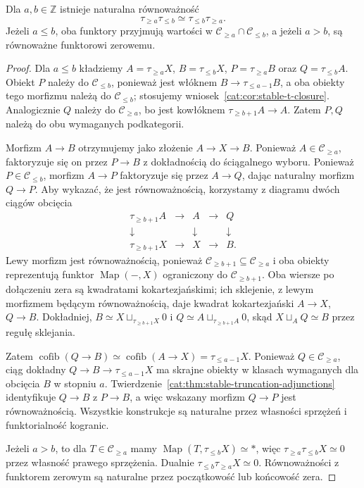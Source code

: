 \begin{stwierdzenie}\label{cat:prop:stable-truncation-commute}
Dla $a,b\in\mathbb Z$ istnieje naturalna równoważność
\[
 \tau_{\geq a}\tau_{\leq b}\simeq
 \tau_{\leq b}\tau_{\geq a}.
\]
Jeżeli $a\leq b$, oba funktory przyjmują wartości w $\mathcal C_{\geq a}\cap\mathcal C_{\leq b}$, a jeżeli $a>b$, są równoważne funktorowi zerowemu.
\end{stwierdzenie}
\begin{proof}
Dla $a\leq b$ kładziemy $A=\tau_{\geq a}X$, $B=\tau_{\leq b}X$, $P=\tau_{\geq a}B$ oraz $Q=\tau_{\leq b}A$. Obiekt $P$ należy do $\mathcal C_{\leq b}$, ponieważ jest włóknem $B\to\tau_{\leq a-1}B$, a oba obiekty tego morfizmu należą do $\mathcal C_{\leq b}$; stosujemy wniosek~\ref{cat:cor:stable-t-closure}. Analogicznie $Q$ należy do $\mathcal C_{\geq a}$, bo jest kowłóknem $\tau_{\geq b+1}A\to A$. Zatem $P,Q$ należą do obu wymaganych podkategorii.

Morfizm $A\to B$ otrzymujemy jako złożenie $A\to X\to B$. Ponieważ $A\in\mathcal C_{\geq a}$, faktoryzuje się on przez $P\to B$ z dokładnością do ściągalnego wyboru. Ponieważ $P\in\mathcal C_{\leq b}$, morfizm $A\to P$ faktoryzuje się przez $A\to Q$, dając naturalny morfizm $Q\to P$. Aby wykazać, że jest równoważnością, korzystamy z diagramu dwóch ciągów obcięcia
\[
\begin{array}{ccccc}
 \tau_{\geq b+1}A&\longrightarrow&A&\longrightarrow&Q\\
 \downarrow&&\downarrow&&\downarrow\\
 \tau_{\geq b+1}X&\longrightarrow&X&\longrightarrow&B .
\end{array}
\]
Lewy morfizm jest równoważnością, ponieważ $\mathcal C_{\geq b+1}\subseteq\mathcal C_{\geq a}$ i oba obiekty reprezentują funktor $\operatorname{Map}(-,X)$ ograniczony do $\mathcal C_{\geq b+1}$. Oba wiersze po dołączeniu zera są kwadratami kokartezjańskimi; ich sklejenie, z lewym morfizmem będącym równoważnością, daje kwadrat kokartezjański $A\to X$, $Q\to B$. Dokładniej, $B\simeq X\sqcup_{\tau_{\geq b+1}X}0$ i $Q\simeq A\sqcup_{\tau_{\geq b+1}A}0$, skąd $X\sqcup_A Q\simeq B$ przez regułę sklejania.

Zatem $\operatorname{cofib}(Q\to B)\simeq\operatorname{cofib}(A\to X)=\tau_{\leq a-1}X$. Ponieważ $Q\in\mathcal C_{\geq a}$, ciąg dokładny $Q\to B\to\tau_{\leq a-1}X$ ma skrajne obiekty w klasach wymaganych dla obcięcia $B$ w stopniu $a$. Twierdzenie~\ref{cat:thm:stable-truncation-adjunctions} identyfikuje $Q\to B$ z $P\to B$, a więc wskazany morfizm $Q\to P$ jest równoważnością. Wszystkie konstrukcje są naturalne przez własności sprzężeń i funktorialność kogranic.

Jeżeli $a>b$, to dla $T\in\mathcal C_{\geq a}$ mamy $\operatorname{Map}(T,\tau_{\leq b}X)\simeq *$, więc $\tau_{\geq a}\tau_{\leq b}X\simeq0$ przez własność prawego sprzężenia. Dualnie $\tau_{\leq b}\tau_{\geq a}X\simeq0$. Równoważności z funktorem zerowym są naturalne przez początkowość lub końcowość zera.
\end{proof}

